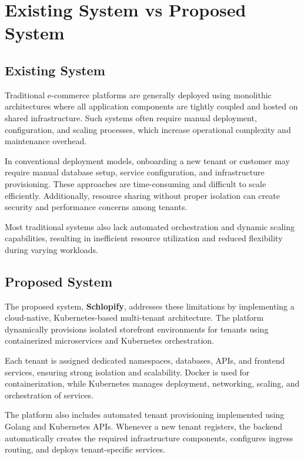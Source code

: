 \documentclass[12pt,a4paper]{report}
\begin{document}
\chapter{Existing System vs Proposed System}

\section{Existing System}

Traditional e-commerce platforms are generally deployed using monolithic architectures where all application components are tightly coupled and hosted on shared infrastructure. Such systems often require manual deployment, configuration, and scaling processes, which increase operational complexity and maintenance overhead.

In conventional deployment models, onboarding a new tenant or customer may require manual database setup, service configuration, and infrastructure provisioning. These approaches are time-consuming and difficult to scale efficiently. Additionally, resource sharing without proper isolation can create security and performance concerns among tenants.

Most traditional systems also lack automated orchestration and dynamic scaling capabilities, resulting in inefficient resource utilization and reduced flexibility during varying workloads.

\section{Proposed System}

The proposed system, \textbf{Schlopify}, addresses these limitations by implementing a cloud-native, Kubernetes-based multi-tenant architecture. The platform dynamically provisions isolated storefront environments for tenants using containerized microservices and Kubernetes orchestration.

Each tenant is assigned dedicated namespaces, databases, APIs, and frontend services, ensuring strong isolation and scalability. Docker is used for containerization, while Kubernetes manages deployment, networking, scaling, and orchestration of services.

The platform also includes automated tenant provisioning implemented using Golang and Kubernetes APIs. Whenever a new tenant registers, the backend automatically creates the required infrastructure components, configures ingress routing, and deploys tenant-specific services.
\end{document}
